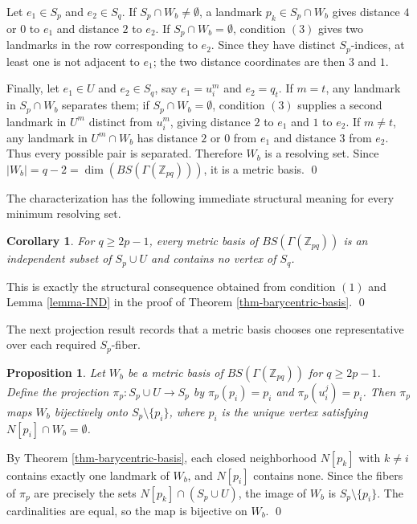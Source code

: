 \documentclass[12pt]{article}
\renewenvironment{proof}{{\bf \noindent Proof.}}{\qed}
\newtheorem{proposition}[theorem]{Proposition}
\newtheorem{corollary}[theorem]{Corollary}
\begin{document}
\begin{proof}
Let $e_1\in S_p$ and $e_2\in S_q$. If $S_p\cap W_b\neq\emptyset$, a landmark $p_k\in S_p\cap W_b$ gives distance $4$ or $0$ to $e_1$ and distance $2$ to $e_2$. If $S_p\cap W_b=\emptyset$, condition $\mathrm{(3)}$ gives two landmarks in the row corresponding to $e_2$. Since they have distinct $S_p$-indices, at least one is not adjacent to $e_1$; the two distance coordinates are then $3$ and $1$.

Finally, let $e_1\in U$ and $e_2\in S_q$, say $e_1=u_i^m$ and $e_2=q_t$. If $m=t$, any landmark in $S_p\cap W_b$ separates them; if $S_p\cap W_b=\emptyset$, condition $\mathrm{(3)}$ supplies a second landmark in $U^m$ distinct from $u_i^m$, giving distance $2$ to $e_1$ and $1$ to $e_2$. If $m\neq t$, any landmark in $U^m\cap W_b$ has distance $2$ or $0$ from $e_1$ and distance $3$ from $e_2$. Thus every possible pair is separated. Therefore $W_b$ is a resolving set. Since $|W_b|=q-2=\dim(BS(\Gamma(\mathbb Z_{pq})))$, it is a metric basis.
\end{proof}

\medskip
\noindent The characterization has the following immediate structural meaning for every minimum resolving set.
\begin{corollary}\label{cor-basis-independent}
For $q\geq 2p-1$, every metric basis of $BS(\Gamma(\mathbb Z_{pq}))$ is an independent subset of $S_p\cup U$ and contains no vertex of $S_q$.
\end{corollary}

\begin{proof}
This is exactly the structural consequence obtained from condition $\mathrm{(1)}$ and Lemma \ref{lemma-IND} in the proof of Theorem \ref{thm-barycentric-basis}.
\end{proof}

\noindent The next projection result records that a metric basis chooses one representative over each required $S_p$-fiber.
\begin{proposition}\label{prop-projection-basis}
Let $W_b$ be a metric basis of $BS(\Gamma(\mathbb Z_{pq}))$ for $q\geq 2p-1$. Define the projection $\pi_p:S_p\cup U\to S_p$ by $\pi_p(p_i)=p_i$ and $\pi_p(u_i^j)=p_i$. Then $\pi_p$ maps $W_b$ bijectively onto $S_p\setminus\{p_i\}$, where $p_i$ is the unique vertex satisfying $N[p_i]\cap W_b=\emptyset$.
\end{proposition}

\begin{proof}
By Theorem \ref{thm-barycentric-basis}, each closed neighborhood $N[p_k]$ with $k\neq i$ contains exactly one landmark of $W_b$, and $N[p_i]$ contains none. Since the fibers of $\pi_p$ are precisely the sets $N[p_k]\cap(S_p\cup U)$, the image of $W_b$ is $S_p\setminus\{p_i\}$. The cardinalities are equal, so the map is bijective on $W_b$.
\end{proof}
\end{document}
